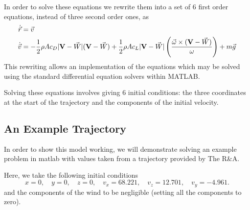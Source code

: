 In order to solve these equations we rewrite them into a set of 6 first order equations, instead of 
three second order ones, as
\begin{subequations}
\begin{align}
\dot{\vec{r}} &= \vec{v} \\
\dot{\vec{v}} &= - \frac{1}{2}\rho A c_D |\mathbf{V} - \vec{W}|(\mathbf{V} - \vec{W}) + \frac{1}{2} \rho A c_L
|\mathbf{V} - \vec{W}| \left(\frac{\vec{\omega} \times (\mathbf{V} - \vec{W})}{\omega}\right) + m \vec{g}
\end{align}
\end{subequations}
This rewriting allows an implementation of the equations which may be solved using the standard
differential equation solvers within MATLAB.

Solving these equations involves giving 6 initial conditions: the three coordinates at the start of
the trajectory and the components of the initial velocity.

\subsection{An Example Trajectory}

In order to show this model working, we will demonstrate solving an example problem in matlab with
values taken from a trajectory provided by The R\&A.

Here, we take the following initial conditions
\[
x = 0, \quad y = 0, \quad z = 0, \quad v_x = 68.221, \quad v_z = 12.701, \quad v_y = -4.961 .
\]
and the components of the wind to be negligible (setting all the components to zero).

